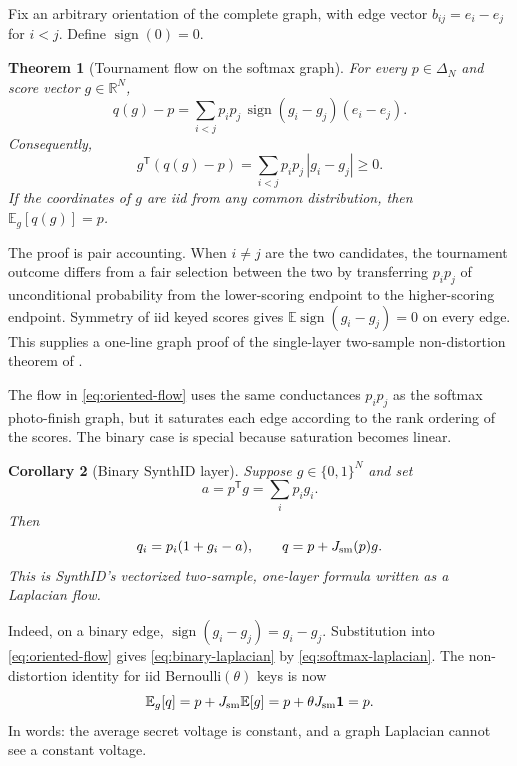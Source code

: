 \documentclass[11pt]{article}
\newtheorem{theorem}{Theorem}[section]
\newtheorem{corollary}[theorem]{Corollary}
\theoremstyle{definition}
\theoremstyle{remark}
\DeclareMathOperator{\sign}{sign}
\newcommand{\R}{\mathbb{R}}
\newcommand{\E}{\mathbb{E}}
\newcommand{\one}{\mathbf{1}}
\newcommand{\trans}{\mathsf{T}}
\begin{document}
Fix an arbitrary orientation of the complete graph, with edge vector $b_{ij}=e_i-e_j$ for $i<j$. Define $\sign(0)=0$.

\begin{theorem}[Tournament flow on the softmax graph]
\label{thm:tournament-flow}
For every $p\in\Delta_N$ and score vector $g\in\R^N$,
\begin{equation}
q(g)-p
=\sum_{i<j}p_i p_j\,\sign(g_i-g_j)(e_i-e_j).
\label{eq:oriented-flow}
\end{equation}
Consequently,
\begin{equation}
g^\trans(q(g)-p)
=\sum_{i<j}p_i p_j\,|g_i-g_j|\ge 0.
\label{eq:score-total-variation}
\end{equation}
If the coordinates of $g$ are iid from any common distribution, then $\E_g[q(g)]=p$.
\end{theorem}

The proof is pair accounting. When $i\ne j$ are the two candidates, the tournament outcome differs from a fair selection between the two by transferring $p_i p_j$ of unconditional probability from the lower-scoring endpoint to the higher-scoring endpoint. Symmetry of iid keyed scores gives $\E\sign(g_i-g_j)=0$ on every edge. This supplies a one-line graph proof of the single-layer two-sample non-distortion theorem of \citet{dathathri2024synthid}.

The flow in \eqref{eq:oriented-flow} uses the same conductances $p_i p_j$ as the softmax photo-finish graph, but it saturates each edge according to the rank ordering of the scores. The binary case is special because saturation becomes linear.

\begin{corollary}[Binary SynthID layer]
\label{cor:binary-layer}
Suppose $g\in\{0,1\}^N$ and set
\begin{equation}
a=p^\trans g=\sum_i p_i g_i.
\end{equation}
Then
\begin{equation}
q_i=p_i(1+g_i-a),
\qquad
q=p+J_{\rm sm}(p)g.
\label{eq:binary-laplacian}
\end{equation}
This is SynthID's vectorized two-sample, one-layer formula written as a Laplacian flow.
\end{corollary}

Indeed, on a binary edge, $\sign(g_i-g_j)=g_i-g_j$. Substitution into \eqref{eq:oriented-flow} gives \eqref{eq:binary-laplacian} by \eqref{eq:softmax-laplacian}. The non-distortion identity for iid Bernoulli$(\theta)$ keys is now
\begin{equation}
\E_g[q]
=p+J_{\rm sm}\E[g]
=p+\theta J_{\rm sm}\one=p.
\label{eq:nullspace-nondist}
\end{equation}
In words: the average secret voltage is constant, and a graph Laplacian cannot see a constant voltage.
\end{document}
